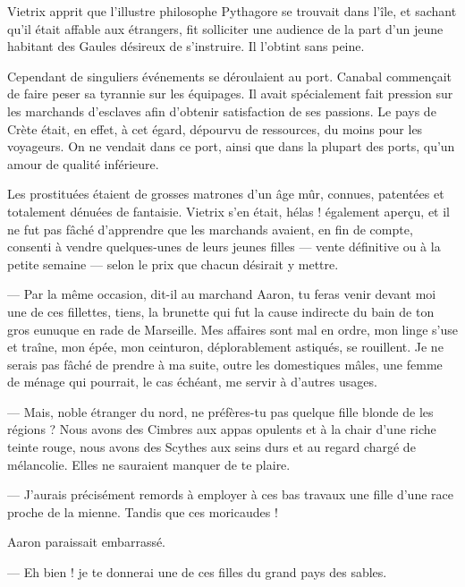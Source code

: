 \documentclass[a4paper, 11pt, oneside, polutonikogreek, french]{article}
\begin{document}
\bigskip
\centerline{\EightStarTaper}
\centerline{\EightStarTaper\EightStarTaper}
\bigskip

Vietrix apprit que l'illustre philosophe Pythagore se trouvait dans l'île, et sachant qu'il était affable aux étrangers, fit solliciter une audience de la part d'un jeune habitant des Gaules désireux de s'instruire. Il l'obtint sans peine.

\bigskip
\centerline{\EightStarTaper}
\centerline{\EightStarTaper\EightStarTaper}
\bigskip

Cependant de singuliers événements se déroulaient au port. Canabal commençait de faire peser sa tyrannie sur les équipages. Il avait spécialement fait pression sur les marchands d'esclaves afin d'obtenir satisfaction de ses passions. Le pays de Crète était, en effet, à cet égard, dépourvu de ressources, du moins pour les voyageurs. On ne vendait dans ce port, ainsi que dans la plupart des ports, qu'un amour de qualité inférieure.

Les prostituées étaient de grosses matrones d'un âge mûr, connues, patentées et totalement dénuées de fantaisie. Vietrix s'en était, hélas ! également aperçu, et il ne fut pas fâché d'apprendre que les marchands avaient, en fin de compte, consenti à vendre quelques-unes de leurs jeunes filles --- vente définitive ou à la petite semaine --- selon le prix que chacun désirait y mettre.

--- Par la même occasion, dit-il au marchand Aaron, tu feras venir devant moi une de ces fillettes, tiens, la brunette qui fut la cause indirecte du bain de ton gros eunuque en rade de Marseille. Mes affaires sont mal en ordre, mon linge s'use et traîne, mon épée, mon ceinturon, déplorablement astiqués, se rouillent. Je ne serais pas fâché de prendre à ma suite, outre les domestiques mâles, une femme de ménage qui pourrait, le cas échéant, me servir à d'autres usages.

--- Mais, noble étranger du nord, ne préfères-tu pas quelque fille blonde de les régions ? Nous avons des Cimbres aux appas opulents et à la chair d'une riche teinte rouge, nous avons des Scythes aux seins durs et au regard chargé de mélancolie. Elles ne sauraient manquer de te plaire.

--- J'aurais précisément remords à employer à ces bas travaux une fille d'une race proche de la mienne. Tandis que ces moricaudes !

Aaron paraissait embarrassé.

--- Eh bien ! je te donnerai une de ces filles du grand pays des sables.
\end{document}
